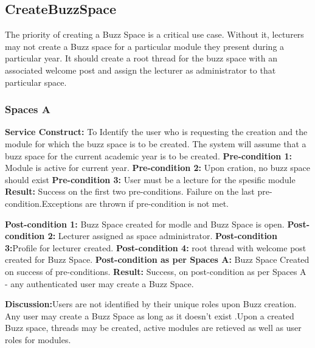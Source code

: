 
\subsection{CreateBuzzSpace}
The priority of creating a Buzz Space is a critical use case. Without it, lecturers may not create a Buzz space for a particular module they present during a particular year. It should create a root thread for the buzz space with an associated welcome post and assign the lecturer as administrator to that particular space.

\subsubsection{Spaces A}
\textbf{Service Construct:}  To Identify the user who is requesting the creation and the module for which the buzz space is to be 		                                              created. The system will assume that a buzz space for the current academic year is to be created.   	 
  				   \newline
\textbf{Pre-condition 1:}  Module is active for current year.  \newline
\textbf{Pre-condition 2:}  Upon cration, no buzz space should exist \newline
\textbf{Pre-condition 3:}  User must be a lecture for the spesific module \newline
\textbf{Result:} Success on the first two  pre-conditions. Failure on the last pre-condition.Exceptions are thrown if pre-condition is not met.\newline

\textbf{Post-condition 1:} Buzz Space created for modle and Buzz Space is open.\newline
\textbf{Post-condition 2:} Lecturer assigned as space administrator.\newline
\textbf{Post-condition 3:}Profile for lecturer created.\newline
\textbf{Post-condition 4:} root thread with welcome post created for Buzz Space.\newline
\textbf{Post-condition as per Spaces A:} Buzz Space Created on success of pre-conditions. \newline
\textbf{Result:} Success, on post-condition as per Spaces A -  any authenticated user may create a Buzz Space.\newline
  
\textbf{Discussion:}Users are not identified by their unique roles upon Buzz creation. Any user may create a Buzz Space as long as it doesn't exist .Upon a created Buzz space, threads may be created, active modules are retieved as well as user roles for modules. 

